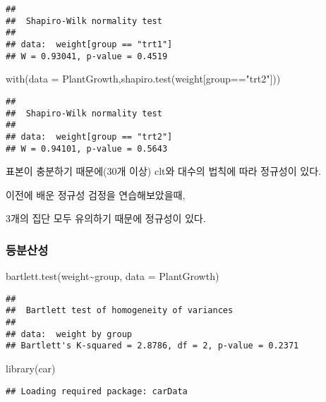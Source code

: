 \documentclass[
]{article}
\newenvironment{Shaded}{\begin{snugshade}}{\end{snugshade}}
\newcommand{\AttributeTok}[1]{\textcolor[rgb]{0.77,0.63,0.00}{#1}}
\newcommand{\FunctionTok}[1]{\textcolor[rgb]{0.00,0.00,0.00}{#1}}
\newcommand{\NormalTok}[1]{#1}
\newcommand{\SpecialCharTok}[1]{\textcolor[rgb]{0.00,0.00,0.00}{#1}}
\newcommand{\StringTok}[1]{\textcolor[rgb]{0.31,0.60,0.02}{#1}}
\begin{document}
\begin{verbatim}
## 
##  Shapiro-Wilk normality test
## 
## data:  weight[group == "trt1"]
## W = 0.93041, p-value = 0.4519
\end{verbatim}

\begin{Shaded}
\begin{Highlighting}[]
\FunctionTok{with}\NormalTok{(}\AttributeTok{data =}\NormalTok{ PlantGrowth,}\FunctionTok{shapiro.test}\NormalTok{(weight[group}\SpecialCharTok{==}\StringTok{"trt2"}\NormalTok{]))}
\end{Highlighting}
\end{Shaded}

\begin{verbatim}
## 
##  Shapiro-Wilk normality test
## 
## data:  weight[group == "trt2"]
## W = 0.94101, p-value = 0.5643
\end{verbatim}

표본이 충분하기 때문에(30개 이상) clt와 대수의 법칙에 따라 정규성이 있다.

이전에 배운 정규성 검정을 연습해보았을때,

3개의 집단 모두 유의하기 때문에 정규성이 있다.

\hypertarget{uxb4f1uxbd84uxc0b0uxc131}{%
\subsubsection{등분산성}\label{uxb4f1uxbd84uxc0b0uxc131}}

\begin{Shaded}
\begin{Highlighting}[]
\FunctionTok{bartlett.test}\NormalTok{(weight}\SpecialCharTok{\textasciitilde{}}\NormalTok{group, }\AttributeTok{data =}\NormalTok{ PlantGrowth)}
\end{Highlighting}
\end{Shaded}

\begin{verbatim}
## 
##  Bartlett test of homogeneity of variances
## 
## data:  weight by group
## Bartlett's K-squared = 2.8786, df = 2, p-value = 0.2371
\end{verbatim}

\begin{Shaded}
\begin{Highlighting}[]
\FunctionTok{library}\NormalTok{(car)}
\end{Highlighting}
\end{Shaded}

\begin{verbatim}
## Loading required package: carData
\end{verbatim}
\end{document}
